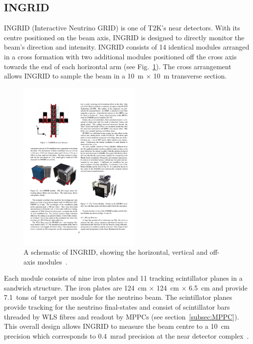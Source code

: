 \subsection{INGRID}
\label{subsec:INGRID}
INGRID (Interactive Neutrino GRID) is one of T2K's near detectors.  With its centre positioned on the beam axis, INGRID is designed to directly monitor the beam's direction and intensity.  INGRID consists of 14 identical modules arranged in a cross formation with two additional modules positioned off the cross axis towards the end of each horizontal arm (see Fig.~\ref{fig:INGRIDSchematic}).  The cross arrangement allows INGRID to sample the beam in a 10~m $\times$ 10~m transverse section.
\begin{figure}
  \centering
  \includegraphics[width=6cm]{images/t2k/INGRID.pdf}
  \caption{A schematic of INGRID, showing the horizontal, vertical and off-axis modules~\cite{Abe2011106}.}
  \label{fig:INGRIDSchematic}
\end{figure}
\newline
\newline
Each module consists of nine iron plates and 11 tracking scintillator planes in a sandwich structure.  The iron plates are 124~cm $\times$ 124~cm $\times$ 6.5~cm and provide 7.1~tons of target per module for the neutrino beam.  The scintillator planes provide tracking for the neutrino final-states and consist of scintillator bars threaded by WLS fibres and readout by MPPCs (see section~\ref{subsec:MPPC}).
\newline
\newline
This overall design allows INGRID to measure the beam centre to a 10~cm precision which corresponds to 0.4~mrad precision at the near detector complex~\cite{Abe2011106}.


